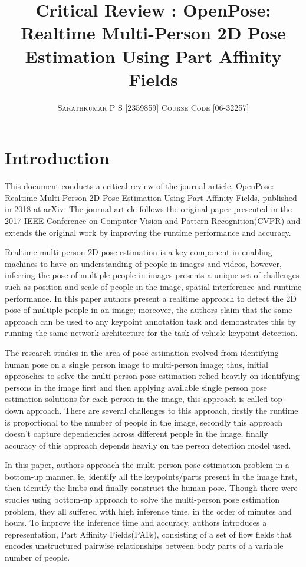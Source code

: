 \documentclass[twocolumn]{article}
\title{Critical Review : OpenPose: Realtime Multi-Person 2D Pose Estimation Using Part Affinity Fields} %
\author{%
\textsc{Sarathkumar P S [2359859] Course Code [06-32257]} \\[1ex] %
}
\date{} %
\begin{document}
\maketitle


\section{Introduction}

This document conducts a critical review of the journal article, OpenPose: Realtime Multi-Person 2D Pose Estimation Using Part Affinity Fields\cite{DBLP:journals/corr/abs-1812-08008}, published in 2018 at arXiv. The journal article follows the original paper \cite{cCao_2017_CVPR} presented in the 2017 IEEE Conference on Computer Vision and Pattern Recognition(CVPR) and extends the original work by improving the runtime performance and accuracy.

Realtime multi-person 2D pose estimation is a key component in enabling machines to have an understanding of people in images and videos, however, inferring the pose of multiple people in images presents a unique set of challenges such as position and scale of people in the image, spatial interference and runtime performance. In this paper authors present a realtime approach to detect the 2D pose of multiple people in an image; moreover, the authors claim that the same approach can be used to any keypoint annotation task and demonstrates this by running the same network architecture for the task of vehicle keypoint detection.

The research studies in the area of pose estimation evolved from identifying human pose on a single person image to multi-person image; thus, initial approaches to solve the multi-person pose estimation relied heavily on identifying persons in the image first and then applying available single person pose estimation solutions for each person in the image, this approach is called top-down approach. There are several challenges to this approach, firstly the runtime is proportional to the number of people in the image, secondly this approach doesn't capture dependencies across different people in the image, finally accuracy of this approach depends heavily on the person detection model used. 

In this paper, authors approach the multi-person pose estimation problem in a bottom-up manner, ie, identify all the keypoints/parts present in the image first, then identify the limbs and finally construct the human pose. Though there were studies using bottom-up approach to solve the multi-person pose estimation problem, they all suffered with high inference time, in the order of minutes and hours. To improve the inference time and accuracy, authors introduces a representation, Part Affinity Fields(PAFs), consisting of a set of flow fields that encodes unstructured pairwise relationships between body parts of a variable number of people.
\end{document}
